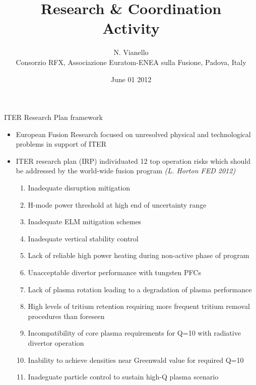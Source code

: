 \documentclass[t,10pt]{beamer}
\title{Research \& Coordination  \\
Activity}
\author{N. Vianello \\
 {\footnotesize Consorzio RFX, Associazione Euratom-ENEA sulla Fusione,
  Padova, Italy}}
\date{ June 01 2012}
\begin{document}
\begin{titleframe}
\end{titleframe}

\begin{frame}{ITER Research Plan framework}
\begin{itemize}
\item European Fusion Research focused on unresolved physical and
technological problems in support of ITER
\item ITER research plan (IRP) individuated 12 top operation risks which 
should be addressed by the world-wide fusion program {\footnotesize
  \textit{(L. Horton FED 2012)}}
\begin{enumerate}
\item {} Inadequate disruption mitigation
\item {} H-mode power threshold at high end of
  uncertainty range
\item {} Inadequate ELM mitigation schemes
\item {} Inadequate vertical stability control
\item {}Lack of reliable high power heating during
  non-active phase of program
\item {} Unacceptable divertor performance with tungsten PFCs
\item {} Lack of plasma rotation leading to a
  degradation of plasma performance
\item {} High levels of tritium retention requiring more
  frequent tritium removal procedures than foreseen
\item {} Incompatibility of core plasma requirements for Q=10 with
  radiative divertor operation
\item {}Inability to achieve densities near
  Greenwald value for required Q=10
\item {} Inadeguate particle control to sustain
  high-Q plasma scenario
\end{enumerate}
\end{itemize}

\end{frame}
\end{document}
